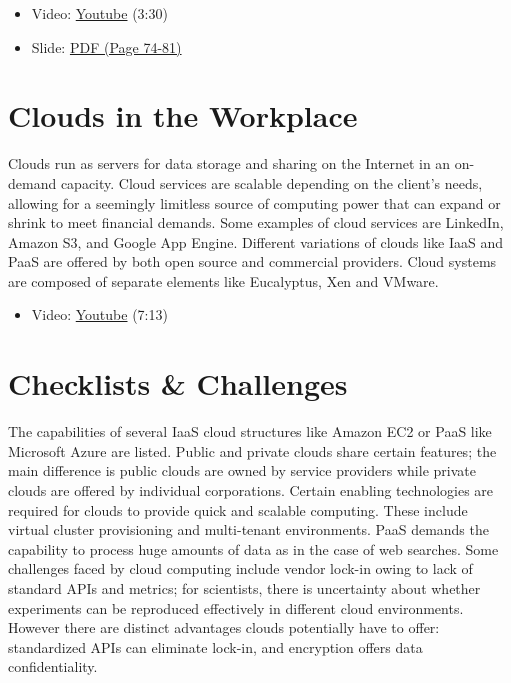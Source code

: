 \begin{itemize}
\tightlist
\item
  Video: \href{https://www.youtube.com/watch?v=mvXBRvTwAVg}{Youtube}
  (3:30)
\item
  Slide:
  \href{https://drive.google.com/open?id=0B88HKpainTSfQU1uQmxZWHdWQ1k}{PDF
  (Page 74-81)}
\end{itemize}

\section{Clouds in the Workplace}\label{clouds-in-the-workplace}

Clouds run as servers for data storage and sharing on the Internet in an
on-demand capacity. Cloud services are scalable depending on the
client's needs, allowing for a seemingly limitless source of computing
power that can expand or shrink to meet financial demands. Some examples
of cloud services are LinkedIn, Amazon S3, and Google App Engine.
Different variations of clouds like IaaS and PaaS are offered by both
open source and commercial providers. Cloud systems are composed of
separate elements like Eucalyptus, Xen and VMware.

\begin{itemize}
\tightlist
\item
  Video: \href{https://www.youtube.com/watch?v=Endt6mWUfEo}{Youtube}
  (7:13)
\end{itemize}

\section{Checklists \& Challenges}\label{checklists-challenges}

The capabilities of several IaaS cloud structures like Amazon EC2 or
PaaS like Microsoft Azure are listed. Public and private clouds share
certain features; the main difference is public clouds are owned by
service providers while private clouds are offered by individual
corporations. Certain enabling technologies are required for clouds to
provide quick and scalable computing. These include virtual cluster
provisioning and multi-tenant environments. PaaS demands the capability
to process huge amounts of data as in the case of web searches. Some
challenges faced by cloud computing include vendor lock-in owing to lack
of standard APIs and metrics; for scientists, there is uncertainty about
whether experiments can be reproduced effectively in different cloud
environments. However there are distinct advantages clouds potentially
have to offer: standardized APIs can eliminate lock-in, and encryption
offers data confidentiality.

